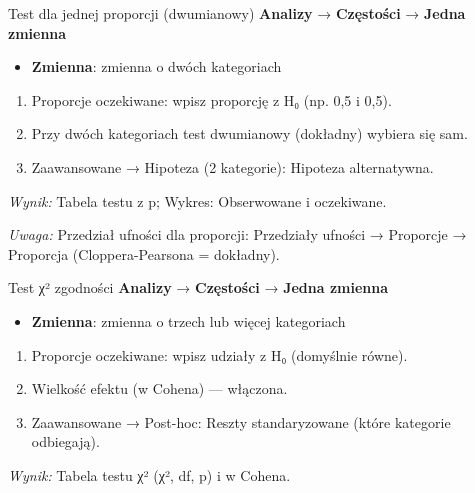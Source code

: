 \documentclass[
  polish,
  10pt,
  a4paper,
  DIV=11,
  numbers=noendperiod]{scrartcl}
\newcommand{\jmenu}[1]{{\color{upwraccent}\small #1}}
\begin{document}
\begin{jbox}{Test dla jednej proporcji (dwumianowy)}\label{w:test-proporcji}
\jmenu{\textbf{Analizy} → \textbf{Częstości} → \textbf{Jedna zmienna}}

\begin{itemize}
\item[$\triangleright$] \textbf{Zmienna}: zmienna o dwóch kategoriach
\end{itemize}
\begin{enumerate}
\item Proporcje oczekiwane: wpisz proporcję z H₀ (np. 0,5 i 0,5).
\item Przy dwóch kategoriach test dwumianowy (dokładny) wybiera się sam.
\item Zaawansowane → Hipoteza (2 kategorie): Hipoteza alternatywna.
\end{enumerate}
\textit{Wynik:} Tabela testu z p; Wykres: Obserwowane i oczekiwane.

{\color{upwrsoft}\small\textit{Uwaga:} Przedział ufności dla proporcji: Przedziały ufności → Proporcje → Proporcja (Cloppera-Pearsona = dokładny).}
\end{jbox}

\begin{jbox}{Test χ² zgodności}\label{w:chi2-zgodnosc}
\jmenu{\textbf{Analizy} → \textbf{Częstości} → \textbf{Jedna zmienna}}

\begin{itemize}
\item[$\triangleright$] \textbf{Zmienna}: zmienna o trzech lub więcej kategoriach
\end{itemize}
\begin{enumerate}
\item Proporcje oczekiwane: wpisz udziały z H₀ (domyślnie równe).
\item Wielkość efektu (w Cohena) — włączona.
\item Zaawansowane → Post-hoc: Reszty standaryzowane (które kategorie odbiegają).
\end{enumerate}
\textit{Wynik:} Tabela testu χ² (χ², df, p) i w Cohena.

\end{jbox}
\end{document}
